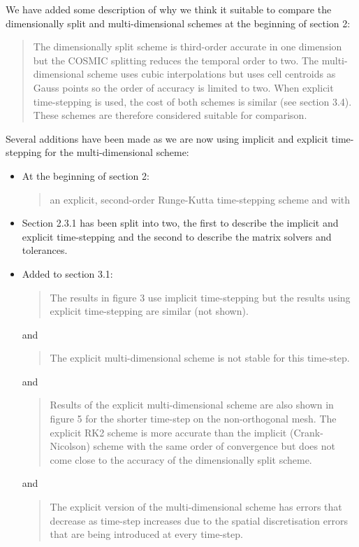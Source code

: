 \documentclass[12pt]{article}
\begin{document}
\begin{description}
We have added some description of why we think it suitable to compare the dimensionally split and multi-dimensional schemes at the beginning of section 2:
\begin{quote}
The dimensionally split scheme is third-order accurate in one dimension but the COSMIC splitting reduces the temporal order to two. The multi-dimensional scheme uses cubic interpolations but uses cell centroids as Gauss points so the order of accuracy is limited to two. When explicit time-stepping is used, the cost of both schemes is similar (see section 3.4). These schemes are therefore considered suitable for comparison. 
\end{quote}

Several additions have been made as we are now using implicit and explicit time-stepping for the multi-dimensional scheme:

\begin{itemize}
\item At the beginning of section 2:
\begin{quote}
an explicit, second-order Runge-Kutta time-stepping scheme and with
\end{quote}

\item
Section 2.3.1 has been split into two, the first to describe the implicit and explicit time-stepping and the second to describe the matrix solvers and tolerances. 

\item Added to section 3.1:
\begin{quote}
The results in figure 3 use implicit time-stepping but the results using explicit time-stepping are similar (not shown). 
\end{quote}
and
\begin{quote}
The explicit multi-dimensional scheme is not stable for this time-step.
\end{quote}
and
\begin{quote}
Results of the explicit multi-dimensional scheme are also shown in figure 5 for the shorter time-step on the non-orthogonal mesh. The explicit RK2 scheme is more accurate than the implicit (Crank-Nicolson) scheme with the same order of convergence but does not come close to the accuracy of the dimensionally split scheme.
\end{quote}
and
\begin{quote}
The explicit version of the multi-dimensional scheme has errors that decrease as time-step increases due to the spatial discretisation errors that are being introduced at every time-step. 
\end{quote}


\end{itemize}
\end{description}
\end{document}
